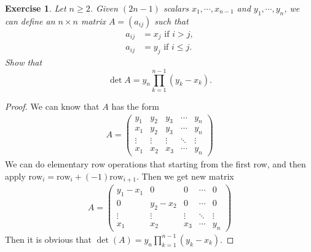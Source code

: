\documentclass[11pt]{book}
\newtheorem{exercise}{Exercise}[section]
\theoremstyle{definition}
\numberwithin{equation}{chapter}
\begin{document}
\medskip

\begin{exercise}
Let $n\geq2$. Given $\left(  2n-1\right)  $ scalars $x_{1}%
,\cdots,x_{n-1}$ and $y_{1},\cdots,y_{n}$, we can define an $n\times n$ matrix
$A=\left(  a_{ij}\right)  $ such that%
\begin{align*}
a_{ij} &  =x_{j}\text{ if }i>j,\\
a_{ij} &  =y_{j}\text{ if }i\leq j.
\end{align*}
Show that%
$$
\det A=y_{n}%
{\displaystyle\prod\limits_{k=1}^{n-1}}
\left(  y_{k}-x_{k}\right).
$$
\end{exercise}
\begin{proof}
We can know that $A$ has the form 
\begin{align*}
    A = \begin{pmatrix}
    y_1 & y_2 & y_3 & \cdots & y_n \\
    x_1 & y_2 & y_3 & \cdots & y_n \\
    \vdots & \vdots & \vdots & \ddots & \vdots \\
    x_1 & x_2 & x_3 & \cdots & y_n
    \end{pmatrix}
\end{align*}
We can do elementary row operations that starting from the first row, and then apply $\text{row}_i=\text{row}_i+(-1)\text{row}_{i+1}$. Then we get new matrix
\begin{align*}
    A = \begin{pmatrix}
    y_1-x_1 & 0 & 0 & \cdots & 0 \\
    0 & y_2-x_2 & 0 & \cdots & 0 \\
    \vdots & \vdots & \vdots & \ddots & \vdots \\
    x_1 & x_2 & x_3 & \cdots & y_n
    \end{pmatrix}
\end{align*}
Then it is obvious that $\det(A)=y_n \prod_{k=1}^{n-1} (y_k-x_k)$.
\end{proof}

\medskip
\end{document}
